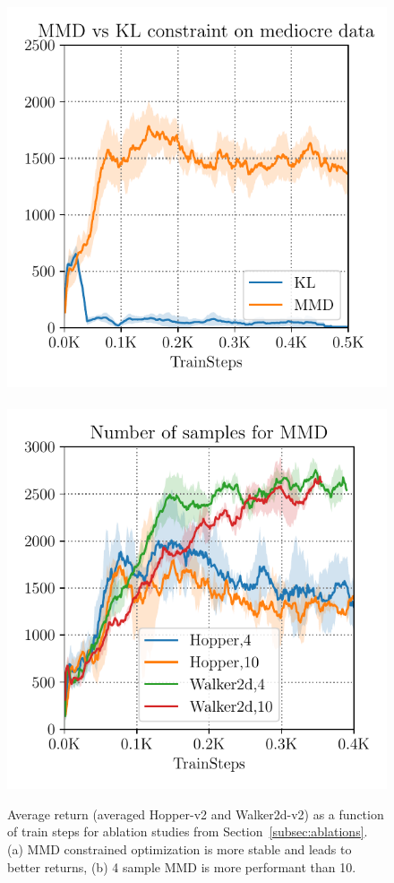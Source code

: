 \begin{figure}
        \includegraphics[width=0.48\linewidth]{chapters/bear/images/kl_vs_mmd_ablation_final.pdf}
       ~
        \includegraphics[width=0.48\linewidth]{chapters/bear/images/num_samples_ablation.pdf}
      \caption{\footnotesize Average return (averaged Hopper-v2 and Walker2d-v2) as a function of train steps for ablation studies from Section~\ref{subsec:ablations}. (a) MMD constrained optimization is more stable and leads to better returns, (b) 4 sample MMD is more performant than 10.}
      \label{fig:ablations}
\vspace{-10pt}
\end{figure}

